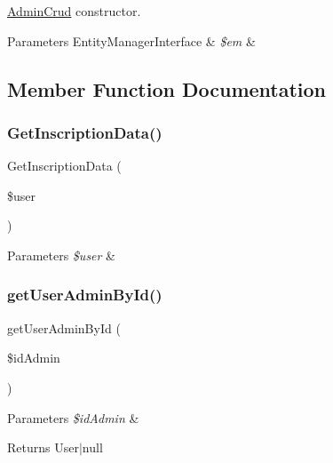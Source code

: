 \mbox{\hyperlink{class_app_1_1_d_a_l_1_1_admin_crud}{Admin\+Crud}} constructor. 
\begin{DoxyParams}[1]{Parameters}
Entity\+Manager\+Interface & {\em \$em} & \\
\hline
\end{DoxyParams}


\subsection{Member Function Documentation}
\mbox{\label{class_app_1_1_d_a_l_1_1_admin_crud_a27ced7f805689012f068a9a83b182a39}} 
\subsubsection{\texorpdfstring{GetInscriptionData()}{GetInscriptionData()}}
{\footnotesize\ttfamily Get\+Inscription\+Data (\begin{DoxyParamCaption}\item[{}]{\$user }\end{DoxyParamCaption})}


\begin{DoxyParams}{Parameters}
{\em \$user} & \\
\hline
\end{DoxyParams}
\mbox{\label{class_app_1_1_d_a_l_1_1_admin_crud_a9b1284e3e1a2733326abd1c013e15c15}} 
\subsubsection{\texorpdfstring{getUserAdminById()}{getUserAdminById()}}
{\footnotesize\ttfamily get\+User\+Admin\+By\+Id (\begin{DoxyParamCaption}\item[{}]{\$id\+Admin }\end{DoxyParamCaption})}


\begin{DoxyParams}{Parameters}
{\em \$id\+Admin} & \\
\hline
\end{DoxyParams}
\begin{DoxyReturn}{Returns}
User$\vert$null 
\end{DoxyReturn}
\mbox{\label{class_app_1_1_d_a_l_1_1_admin_crud_a4841ba151b489ed4738f598a597446cb}} 

